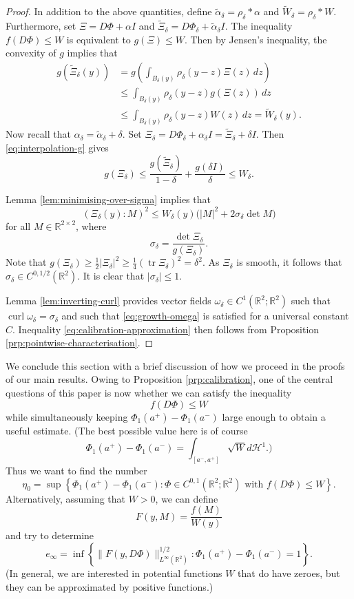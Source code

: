 \documentclass[a4paper]{article}
\newcommand{\R}{\mathbb{R}}
\newcommand{\Ha}{\mathcal{H}}
\DeclareMathOperator{\curl}{curl}
\DeclareMathOperator{\tr}{tr}
\newcommand{\set}[2]{\left\{ #1 \colon #2 \right\}}
\theoremstyle{definition}
\theoremstyle{remark}
\begin{document}
\begin{proof}
In addition to the above quantities, define
$\tilde{\alpha}_\delta = \rho_\delta * \alpha$ and
$\tilde{W}_\delta = \rho_\delta * W$. Furthermore, set $\Xi = D\Phi + \alpha I$ and
$\tilde{\Xi}_\delta = D\Phi_\delta + \tilde{\alpha}_\delta I$.
The inequality $f(D\Phi) \le W$ is equivalent to $g(\Xi) \le W$.
Then by Jensen's inequality, the convexity of $g$ implies that
\[
\begin{split}
g(\tilde{\Xi}_\delta(y)) & = g\left(\int_{B_\delta(y)} \rho_\delta(y - z) \Xi(z) \, dz\right) \\
& \le \int_{B_\delta(y)} \rho_\delta(y - z) g(\Xi(z)) \, dz \\
& \le \int_{B_\delta(y)} \rho_\delta(y - z) W(z) \, dz  = \tilde{W}_\delta(y).
\end{split}
\]
Now recall that $\alpha_\delta = \tilde{\alpha}_\delta + \delta$. Set
$\Xi_\delta = D\Phi_\delta + \alpha_\delta I = \tilde{\Xi}_\delta + \delta I$.
Then \eqref{eq:interpolation-g} gives
\[
g(\Xi_\delta) \le \frac{g(\tilde{\Xi}_\delta)}{1 - \delta} + \frac{g(\delta I)}{\delta} \le W_\delta.
\]

Lemma \ref{lem:minimising-over-sigma}
implies that
\[
(\Xi_\delta(y) : M)^2 \le W_\delta(y) \bigl(|M|^2 + 2 \sigma_\delta \det M\bigr)
\]
for all $M \in \R^{2 \times 2}$, where
\[
\sigma_\delta = \frac{\det \Xi_\delta}{g(\Xi_\delta)}.
\]
Note that $g(\Xi_\delta) \ge \frac{1}{2}|\Xi_\delta|^2 \ge \frac{1}{4} (\tr \Xi_\delta)^2 = \delta^2$. As $\Xi_\delta$ is smooth, it follows that
$\sigma_\delta \in C^{0, 1/2}(\R^2)$. It is clear that $|\sigma_\delta| \le 1$.

Lemma \ref{lem:inverting-curl} provides vector fields
$\omega_\delta \in C^1(\R^2; \R^2)$ such that
$\curl \omega_\delta = \sigma_\delta$ and such that \eqref{eq:growth-omega}
is satisfied for a universal constant $C$.
Inequality \eqref{eq:calibration-approximation} then follows from
Proposition \ref{prp:pointwise-characterisation}.
\end{proof}

We conclude this section with a brief discussion of how we proceed in the proofs
of our main results.
Owing to Proposition \ref{prp:calibration}, one of the central questions of this
paper is now whether we can satisfy the inequality
\[
f(D\Phi) \le W
\]
while simultaneously keeping $\Phi_1(a^+) - \Phi_1(a^-)$ large enough to
obtain a useful estimate. (The best possible value here is of course
\[
\Phi_1(a^+) - \Phi_1(a^-) = \int_{[a^-, a^+]} \sqrt{W} d\Ha^1.)
\]
Thus we want to find the number
\[
\eta_0 = \sup\set{\Phi_1(a^+) - \Phi_1(a^-)}{\Phi \in C^{0, 1}(\R^2; \R^2) \text{ with } f(D\Phi) \le W}.
\]
Alternatively, assuming that $W > 0$, we can define
\[
F(y, M) = \frac{f(M)}{W(y)}
\]
and try to determine
\[
e_\infty = \inf\set{\|F(y, D\Phi)\|_{L^\infty(\R^2)}^{1/2}}{\Phi_1(a^+) - \Phi_1(a^-) = 1}.
\]
(In general, we are interested in potential functions
$W$ that do have zeroes, but they can be approximated by
positive functions.)
\end{document}
